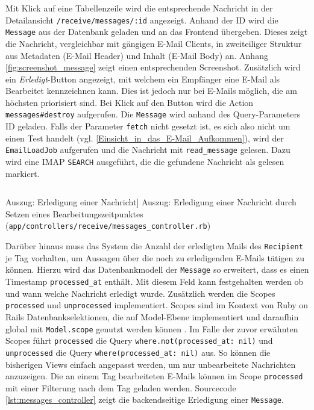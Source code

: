 \noindent Mit Klick auf eine Tabellenzeile wird die entsprechende Nachricht in der Detailansicht \texttt{/receive/messages/:id} angezeigt. Anhand der ID wird die \texttt{Message} aus der Datenbank geladen und an das Frontend übergeben. Dieses zeigt die Nachricht, vergleichbar mit gängigen E-Mail Clients, in zweiteiliger Struktur aus Metadaten (E-Mail Header) und Inhalt (E-Mail Body) an. Anhang \ref{fig:screenshot_message} zeigt einen entsprechenden Screenshot. Zusätzlich wird ein \textit{Erledigt}-Button angezeigt, mit welchem ein Empfänger eine E-Mail als Bearbeitet kennzeichnen kann. Dies ist jedoch nur bei E-Mails möglich, die am höchsten priorisiert sind. Bei Klick auf den Button wird die Action \texttt{messages\#destroy} aufgerufen. Die \texttt{Message} wird anhand des Query-Parameters ID geladen. Falls der Parameter \texttt{fetch} nicht gesetzt ist, es sich also nicht um einen Test handelt (vgl. \ref{Einsicht_in_das_E-Mail_Aufkommen}), wird der \texttt{EmailLoadJob} aufgerufen und die Nachricht mit \texttt{read\_message} gelesen. Dazu wird eine IMAP \texttt{SEARCH} ausgeführt, die die gefundene Nachricht als gelesen markiert. 

\begin{listing}[!ht]
\inputminted[firstline=8, lastline=17, linenos]{ruby}{Listings/Pkg3/messages_controller.rb}

\caption
    [Auszug: Erledigung einer Nachricht]
    {Auszug: Erledigung einer Nachricht durch Setzen eines Bearbeitungszeitpunktes (\texttt{app/controllers/receive/messages\_controller.rb})}

\label{lst:messages_controller}
\end{listing}

\noindent Darüber hinaus muss das System die Anzahl der erledigten Mails des \texttt{Recipient} je Tag vorhalten, um Aussagen über die noch zu erledigenden E-Mails tätigen zu können. Hierzu wird das Datenbankmodell der \texttt{Message} so erweitert, dass es einen Timestamp \texttt{processed\_at} enthält. Mit diesem Feld kann festgehalten werden ob und wann welche Nachricht erledigt wurde. Zusätzlich werden die Scopes \texttt{processed} und \texttt{unprocessed} implementiert. Scopes sind im Kontext von Ruby on Rails Datenbankselektionen, die auf Model-Ebene implementiert und daraufhin global mit \texttt{Model.scope} genutzt werden können \citep{Hansson2022c}. Im Falle der zuvor erwähnten Scopes führt \texttt{processed} die Query \texttt{where.not(processed\_at: nil)} und \texttt{unprocessed} die Query \texttt{where(processed\_at: nil)} aus. So können die bisherigen Views einfach angepasst werden, um nur unbearbeitete Nachrichten anzuzeigen. Die an einem Tag bearbeiteten E-Mails können im Scope \texttt{processed} mit einer Filterung nach dem Tag geladen werden. Sourcecode \ref{lst:messages_controller} zeigt die backendseitige Erledigung einer \texttt{Message}.

